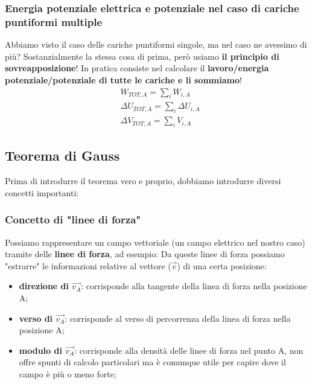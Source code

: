         \subsubsection{Energia potenziale elettrica e potenziale nel caso di cariche puntiformi multiple}
            Abbiamo visto il caso delle cariche puntiformi singole, ma nel caso ne avessimo di più? Sostanzialmente la stessa cosa di prima, però usiamo \textbf{il principio di sovreapposizione}! In pratica consiste nel calcolare il \textbf{lavoro/energia potenziale/potenziale di tutte le cariche e li sommiamo}!
            \begin{align*}
                &W_{TOT, A}=\sum_i W_{i, A}\\
                &\Delta U_{TOT, A} = \sum_i \Delta U_{i, A}\\
                &\Delta V_{TOT, A}=\sum_i V_{i, A}
            \end{align*}

    \subsection{Teorema di Gauss}
        Prima di introdurre il teorema vero e proprio, dobbiamo introdurre diversi concetti importanti:
        \subsubsection{Concetto di "linee di forza"}
            Possiamo rappresentare un campo vettoriale (un campo elettrico nel nostro caso) tramite delle \textbf{linee di forza}, ad esempio:
            Da queste linee di forza possiamo "estrarre" le informazioni relative al vettore ($\vec{v}$) di una certa posizione:
            \begin{itemize}
                \item \textbf{direzione di $\vec{v_A}$}: corrisponde alla tangente della linea di forza nella posizione A;
                \item \textbf{verso di $\vec{v_A}$}: corrisponde al verso di percorrenza della linea di forza nella posizione A;
                \item \textbf{modulo di $\vec{v_A}$}: corrisponde alla densità delle linee di forza nel punto A, non offre spunti di calcolo particolari ma è comunque utile per capire dove il campo è più o meno forte;
            \end{itemize}

